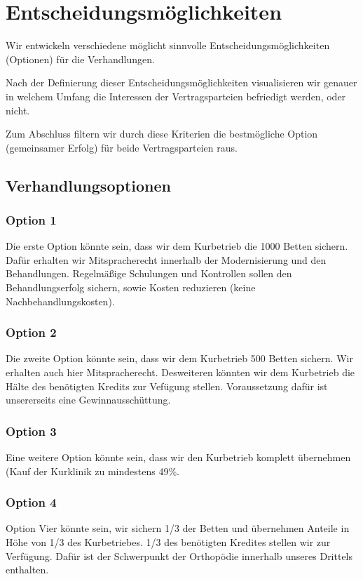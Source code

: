 \chapter{Entscheidungsmöglichkeiten}

Wir entwickeln verschiedene möglicht sinnvolle Entscheidungsmöglichkeiten (Optionen) für die Verhandlungen.

Nach der Definierung dieser Entscheidungsmöglichkeiten visualisieren wir genauer in welchem Umfang die Interessen der Vertragsparteien befriedigt werden, oder nicht.

Zum Abschluss filtern wir durch diese Kriterien die bestmögliche Option (gemeinsamer Erfolg) für beide Vertragsparteien raus.

\section{Verhandlungsoptionen}

\subsection*{Option 1}
Die erste Option könnte sein, dass wir dem Kurbetrieb die 1000 Betten sichern. Dafür erhalten wir Mitspracherecht innerhalb der Modernisierung und den Behandlungen. Regelmäßige Schulungen und Kontrollen sollen den Behandlungserfolg sichern, sowie Kosten reduzieren (keine Nachbehandlungskosten).

\subsection*{Option 2}
Die zweite Option könnte sein, dass wir dem Kurbetrieb 500 Betten sichern. Wir erhalten auch hier Mitspracherecht. Desweiteren könnten wir dem Kurbetrieb die Hälte des benötigten Kredits zur Vefügung stellen. Voraussetzung dafür ist unsererseits eine Gewinnausschüttung.

\subsection*{Option 3}
Eine weitere Option könnte sein, dass wir den Kurbetrieb komplett übernehmen (Kauf der Kurklinik zu mindestens 49\%. 

\subsection*{Option 4}
Option Vier könnte sein, wir sichern 1/3 der Betten und übernehmen Anteile in Höhe von 1/3 des Kurbetriebes. 1/3 des benötigten Kredites stellen wir zur Verfügung. Dafür ist der Schwerpunkt der Orthopödie innerhalb unseres Drittels enthalten.

